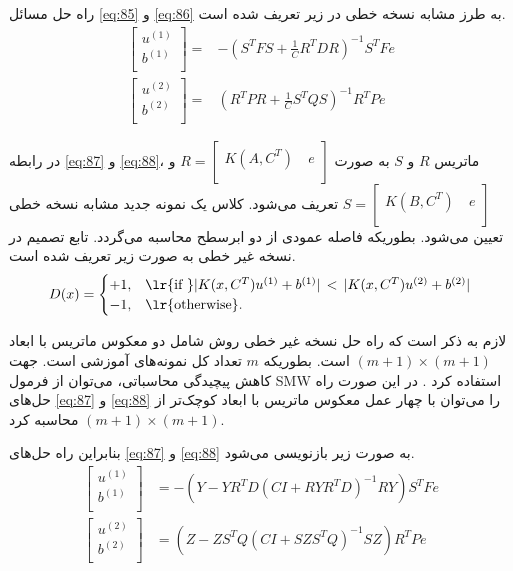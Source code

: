 راه حل مسائل \ref{eq:85} و \ref{eq:86} به طرز مشابه نسخه خطی در زیر تعریف شده است.
\begin{align}
\left[\begin{matrix}
{{u}^{(1)}}  \\
{{b}^{(1)}}  \\
\end{matrix} \right]= & -{({{S}^{T}}FS+\frac{1}{C}{{R}^{T}}DR)^{-1}}{{S}^{T}}Fe \label{eq:87} \\
\left[ \begin{matrix}
{{u}^{(2)}}  \\
{{b}^{(2)}}  \\
\end{matrix} \right]= & {({{R}^{T}}PR+\frac{1}{C}{{S}^{T}}QS)^{-1}}{{R}^{T}}Pe \label{eq:88}
\end{align}

در رابطه \ref{eq:87} و \ref{eq:88}، ماتریس $R$ و $S$  به صورت  $R=\left[ \begin{matrix} K(A,{{C}^{T}})\ & e  \\ \end{matrix} \right]$ و   $S=\left[ \begin{matrix} K(B,{{C}^{T}})\ & e  \\ \end{matrix} \right]$ تعریف می‌شود. کلاس یک نمونه جدید مشابه نسخه خطی تعیین می‌شود. بطوریکه فاصله عمودی از دو ابرسطح محاسبه می‌گردد. تابع تصمیم در نسخه غیر خطی به صورت زیر تعریف شده است. 
\begin{equation}\label{eq:89}
D(x) =
\begin{cases}
+1, & \textrm{\lr{if }} |K(x,{C}^{T}){{u}^{(1)}}+{{b}^{(1)}}|\, < \, |K(x,{C}^{T}){{u}^{(2)}}+{{b}^{(2)}}|  \\
-1, & \textrm{\lr{otherwise}}.
\end{cases}
\end{equation}

لازم به ذکر است که راه حل نسخه غیر خطی روش  شامل دو معکوس ماتریس با ابعاد  $(m+1)\times (m+1)$ است. بطوریکه $m$  تعداد کل نمونه‌های آموزشی است. جهت کاهش پیچیدگی محاسباتی، می‌توان از فرمول \gls{SMW}  استفاده کرد \cite{golub2012}. در این صورت راه حل‌های \ref{eq:87} و \ref{eq:88} را می‌توان با چهار عمل معکوس ماتریس با ابعاد کوچک‌تر از $(m+1)\times (m+1)$ محاسبه کرد. 

بنابراین راه حل‌های \ref{eq:87} و \ref{eq:88} به صورت زیر بازنویسی می‌شود.
\begin{align}
\left[ \begin{matrix}
{{u}^{(1)}}  \\
{{b}^{(1)}}  \\
\end{matrix} \right]& = -(Y-Y{{R}^{T}}D{{(CI+RY{{R}^{T}}D)}^{-1}}RY){{S}^{T}}Fe \label{eq:90} \\
\left[ \begin{matrix}
{{u}^{(2)}}  \\
{{b}^{(2)}}  \\
\end{matrix} \right] & = (Z-Z{{S}^{T}}Q{{(CI+SZ{{S}^{T}}Q)}^{-1}}SZ){{R}^{T}}Pe \label{eq:91}
\end{align}

